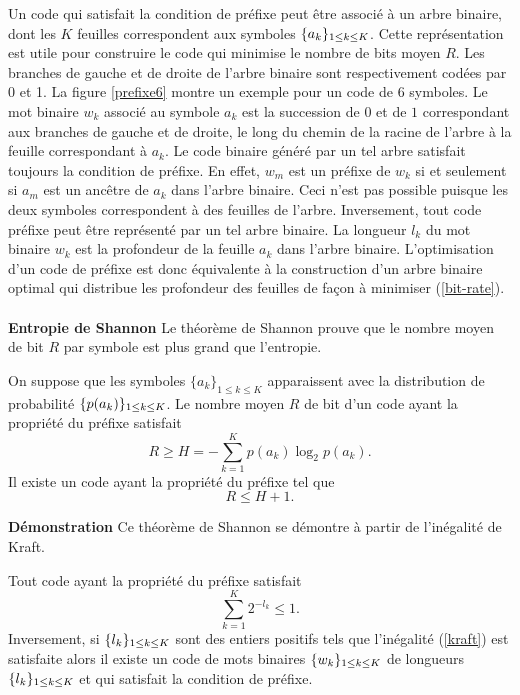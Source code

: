 Un code qui satisfait la condition de pr\'efixe peut \^etre
associ\'e \`a un arbre binaire, dont les $K$ feuilles correspondent
aux symboles $\{a_k \}_{ 1 \leq k \leq K}$.
Cette repr\'esentation est utile pour construire le code 
qui minimise le nombre de bits moyen $R$.
Les branches de gauche et de droite de l'arbre binaire sont
respectivement cod\'ees par 0 et 1.
La figure \ref{prefixe6} montre un exemple pour un code
de $6$ symboles. 
Le mot binaire $w_k$ associ\'e au symbole $a_k$
est la succession de $0$ et de $1$ correspondant aux branches
de gauche et de droite, le long du chemin de la racine de
l'arbre \`a la feuille correspondant \`a $a_k$.
Le code binaire g\'en\'er\'e par un tel arbre satisfait toujours
la condition de pr\'efixe. En effet, $w_m$ est
un pr\'efixe de $w_k$ si et seulement si
$a_m$ est un anc\^etre de $a_k$ dans l'arbre binaire.
Ceci n'est pas possible puisque les deux symboles correspondent
\`a des feuilles de l'arbre. 
Inversement, tout code pr\'efixe peut \^etre repr\'esent\'e par un tel
arbre binaire.
La longueur $l_k$ du mot binaire
$w_k$ est la profondeur de la feuille $a_k$ dans l'arbre binaire.
L'optimisation d'un code de pr\'efixe est donc \'equivalente \`a 
la construction d'un arbre binaire optimal qui distribue 
les profondeur des feuilles de fa\c con \`a minimiser
(\ref{bit-rate}).
\\
\\
{\bf Entropie de Shannon}
Le th\'eor\`eme de Shannon prouve que le nombre moyen de bit $R$
par symbole est plus grand que l'entropie.

\begin{theorem} [Shannon]
\label{shan-th}
On suppose que les symboles
$\{a_k\}_{1 \leq k \leq K}$ apparaissent avec la distribution
de probabilit\'e $\{p(a_k)\}_{ 1 \leq k \leq K}$. 
Le nombre moyen $R$ de bit d'un code ayant la propri\'et\'e du
pr\'efixe satisfait
\begin{equation}
\label{shan1}
R \geq H = - \sum_{k=1}^K p(a_k) \log_2 p(a_k) . 
\end{equation}
Il existe un code ayant la propri\'et\'e du pr\'efixe tel que
\begin{equation}
\label{shan2}
R \leq H + 1.
\end{equation}
\end{theorem}

{\bf D\'emonstration}
Ce th\'eor\`eme de Shannon se d\'emontre \`a partir de 
l'in\'egalit\'e de Kraft.

\begin{lemma} 
Tout code ayant la propri\'et\'e du pr\'efixe satisfait
\begin{equation}
\label{kraft}
\sum_{k=1}^K 2^{-l_k} \leq 1 .
\end{equation}
Inversement, si
$\{ l_k \}_{ 1 \leq k \leq K}$ sont des entiers positifs tels que 
l'in\'egalit\'e (\ref{kraft}) est satisfaite alors il existe
un code de mots binaires $\{w_k \}_{ 1 \leq k \leq K}$ de longueurs
$\{ l_k \}_{ 1 \leq k \leq K}$ et qui satisfait la condition de pr\'efixe.
\end{lemma}

